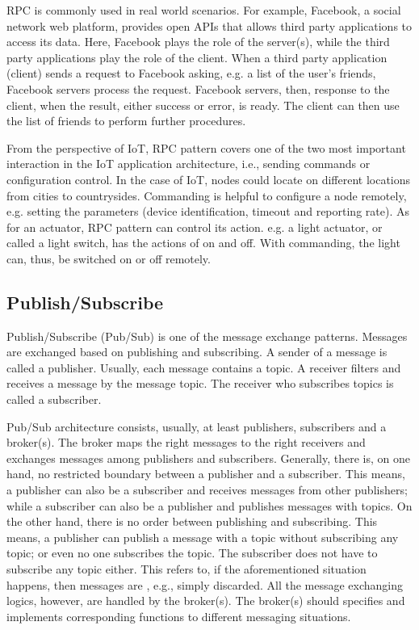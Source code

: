 RPC is commonly used in real world scenarios. For example, Facebook, a social network web platform, provides open APIs that allows third party applications to access its data. Here, Facebook plays the role of the server(s), while the third party applications play the role of the client. When a third party application (client) sends a request to Facebook asking, e.g. a list of the user's friends, Facebook servers process the request. Facebook servers, then, response to the client, when the result, either success or error, is ready. The client can then use the list of friends to perform further procedures. 

From the perspective of IoT, RPC pattern covers one of the two most important interaction in the IoT application architecture, i.e., sending commands or configuration control. In the case of IoT, nodes could locate on different locations from cities to countrysides. Commanding is helpful to configure a node remotely, e.g. setting the parameters (device identification, timeout and reporting rate). As for an actuator, RPC pattern can control its action. e.g. a light actuator, or called a light switch, has the actions of on and off. With commanding, the light can, thus, be switched on or off remotely.

\subsection{Publish/Subscribe}

Publish/Subscribe (Pub/Sub) is one of the message exchange patterns. Messages are exchanged based on publishing and subscribing. A sender of a message is called a publisher. Usually, each message contains a topic. A receiver filters and receives a message by the message topic. The receiver who subscribes topics is called a subscriber. 

Pub/Sub architecture consists, usually, at least publishers, subscribers and a broker(s). The broker maps the right messages to the right receivers and exchanges messages among publishers and subscribers. Generally, there is, on one hand, no restricted boundary between a publisher and a subscriber. This means, a publisher can also be a subscriber and receives messages from other publishers; while a subscriber can also be a publisher and publishes messages with topics. On the other hand, there is no order between publishing and subscribing. This means, a publisher can publish a message with a topic without subscribing any topic; or even no one subscribes the topic. The subscriber does not have to subscribe any topic either. This refers to, if the aforementioned situation happens, then messages are , e.g., simply discarded. All the message exchanging logics, however, are handled by the broker(s). The broker(s) should specifies and implements corresponding functions to different messaging situations. 

